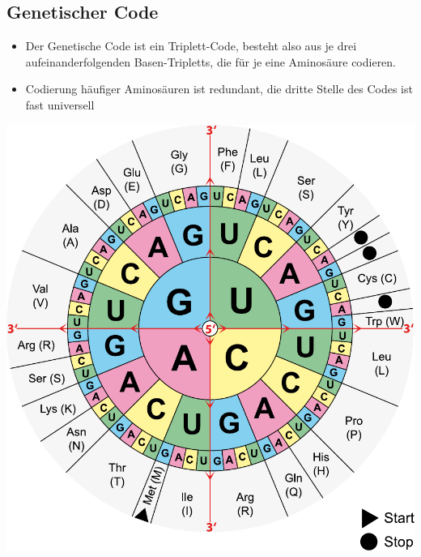 \subsection{Genetischer Code}
    \begin{itemize}
        \item Der Genetische Code ist ein Triplett-Code, besteht also aus je drei aufeinanderfolgenden Basen-Tripletts, die für je eine Aminosäure codieren.
        \item Codierung häufiger Aminosäuren ist redundant, die dritte Stelle des Codes ist fast universell
    \end{itemize}

    \includegraphics[width=1\textwidth]{lectures/V1/pix/Aminoacids_table.pdf}\\
    \caption{``Codesonne''\footnote{\url{https://de.wikipedia.org/wiki/Genetischer_Code}}}

